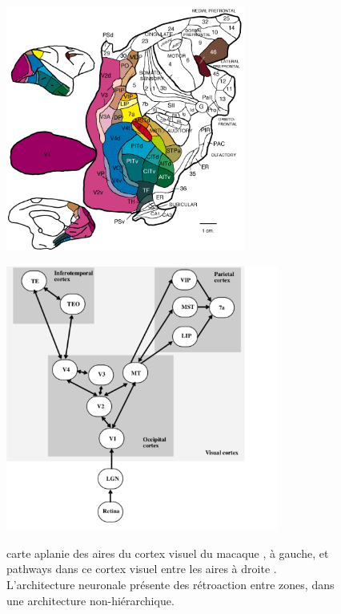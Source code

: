 \begin{figure}[t]
\begin{minipage}{0.5\textwidth}
\centering
\includegraphics[width=0.7\textwidth]{FVE_fig2map.png}
\label{fig:cortex1}
\end{minipage}
\begin{minipage}{0.5\textwidth}
\centering
\includegraphics[width=0.8\textwidth]{rolls_pathways.pdf}
\label{fig:cortex2}
\end{minipage}
\caption{carte aplanie des aires du cortex visuel du macaque \cite{primate_cortex_91}, à gauche, et pathways dans ce cortex visuel entre les aires à droite \cite{Rolls2002ComputationalNO}. L'architecture neuronale présente des rétroaction entre zones, dans une architecture non-hiérarchique.}
\end{figure}

